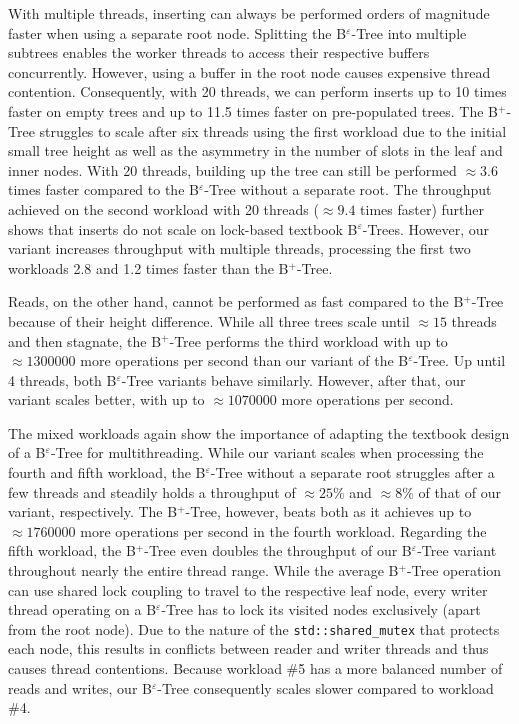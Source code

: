 With multiple threads, inserting can always be performed orders of magnitude faster when using a separate root node. Splitting the B$^\varepsilon$-Tree into multiple subtrees enables the worker threads to access their respective buffers concurrently. However, using a buffer in the root node causes expensive thread contention. Consequently, with 20 threads, we can perform inserts up to 10 times faster on empty trees and up to 11.5 times faster on pre-populated trees. The B$^+$-Tree struggles to scale after six threads using the first workload due to the initial small tree height as well as the asymmetry in the number of slots in the leaf and inner nodes.\newline
With 20 threads, building up the tree can still be performed $\approx 3.6$ times faster compared to the B$^\varepsilon$-Tree without a separate root. The throughput achieved on the second workload with 20 threads ($\approx 9.4$ times faster) further shows that inserts do not scale on lock-based textbook B$^\varepsilon$-Trees. However, our variant increases throughput with multiple threads, processing the first two workloads 2.8 and 1.2 times faster than the B$^+$-Tree.

Reads, on the other hand, cannot be performed as fast compared to the B$^+$-Tree because of their height difference. While all three trees scale until $\approx 15$ threads and then stagnate, the B$^+$-Tree performs the third workload with up to $\approx 1300000$ more operations per second than our variant of the B$^\varepsilon$-Tree. Up until 4 threads, both B$^\varepsilon$-Tree variants behave similarly. However, after that, our variant scales better, with up to $\approx 1070000$ more operations per second.

The mixed workloads again show the importance of adapting the textbook design of a B$^\varepsilon$-Tree for multithreading. While our variant scales when processing the fourth and fifth workload, the B$^\varepsilon$-Tree without a separate root struggles after a few threads and steadily holds a throughput of $\approx 25\%$ and $\approx 8\%$ of that of our variant, respectively. The B$^+$-Tree, however, beats both as it achieves up to $\approx 1760000$ more operations per second in the fourth workload. Regarding the fifth workload, the B$^+$-Tree even doubles the throughput of our B$^\varepsilon$-Tree variant throughout nearly the entire thread range.\newline
While the average B$^+$-Tree operation can use shared lock coupling to travel to the respective leaf node, every writer thread operating on a B$^\varepsilon$-Tree has to lock its visited nodes exclusively (apart from the root node). Due to the nature of the \texttt{std::shared\_mutex} that protects each node, this results in conflicts between reader and writer threads and thus causes thread contentions. Because workload \#5 has a more balanced number of reads and writes, our B$^\varepsilon$-Tree consequently scales slower compared to workload \#4.

